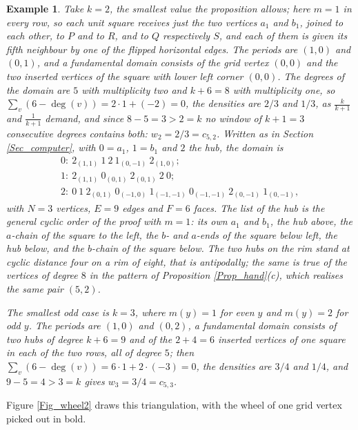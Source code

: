 \documentclass[12pt,a4paper]{article}%
\newtheorem{example}[theorem]{Example}
\begin{document}
\begin{example}
\label{Ex_wheel2}Take $k=2$, the smallest value the proposition allows; here $m=1$ in every row, so
each unit square receives just the two vertices $a_{1}$ and $b_{1}$, joined to each other, to $P$ and
to $R$, and to $Q$ respectively $S$, and each of them is given its fifth neighbour by one of the
flipped horizontal edges. The periods are $(1,0)$ and $(0,1)$, and a fundamental domain consists of
the grid vertex $(0,0)$ and the two inserted vertices of the square with lower left corner $(0,0)$.
The degrees of the domain are $5$ with multiplicity two and $k+6=8$ with multiplicity one, so
$\sum_{v}(6-\deg (v))=2\cdot 1+(-2)=0$, the densities are $2/3$ and $1/3$, as $\frac{k}{k+1}$ and
$\frac{1}{k+1}$ demand, and since $8-5=3>2=k$ no window of $k+1=3$ consecutive degrees contains both:
$w_{2}=2/3=c_{5,2}$. Written as in Section \ref{Sec_computer}, with $0=a_{1}$, $1=b_{1}$ and $2$ the
hub, the domain is
\[
\begin{array}{l}
0:\ 2_{(1,1)}\ 1\ 2\ 1_{(0,-1)}\ 2_{(1,0)};\\
1:\ 2_{(1,1)}\ 0_{(0,1)}\ 2_{(0,1)}\ 2\ 0;\\
2:\ 0\ 1\ 2_{(0,1)}\ 0_{(-1,0)}\ 1_{(-1,-1)}\ 0_{(-1,-1)}\ 2_{(0,-1)}\ 1_{(0,-1)},
\end{array}
\]
with $N=3$ vertices, $E=9$ edges and $F=6$ faces. The list of the hub is the general cyclic order of
the proof with $m=1$: its own $a_{1}$ and $b_{1}$, the hub above, the $a$-chain of the square to the
left, the $b$- and $a$-ends of the square below left, the hub below, and the $b$-chain of the square
below. The two hubs on the rim stand at cyclic distance four on a rim of eight, that is antipodally;
the same is true of the vertices of degree $8$ in the pattern of Proposition \ref{Prop_hand}(c), which
realises the same pair $(5,2)$.

The smallest odd case is $k=3$, where $m(y)=1$ for even $y$ and $m(y)=2$ for odd $y$. The periods are
$(1,0)$ and $(0,2)$, a fundamental domain consists of two hubs of degree $k+6=9$ and of the
$2+4=6$ inserted vertices of one square in each of the two rows, all of degree $5$; then
$\sum_{v}(6-\deg (v))=6\cdot 1+2\cdot (-3)=0$, the densities are $3/4$ and $1/4$, and $9-5=4>3=k$
gives $w_{3}=3/4=c_{5,3}$.
\end{example}

Figure \ref{Fig_wheel2} draws this triangulation, with the wheel of one grid vertex
picked out in bold.
\end{document}
